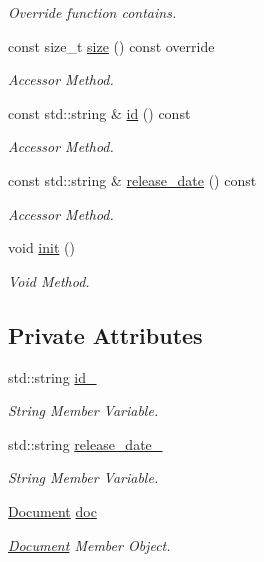 \begin{DoxyCompactItemize}
\begin{DoxyCompactList}\small\item\em Override function contains. \end{DoxyCompactList}\item 
const size\+\_\+t \hyperlink{class_movie_ad396ecf97c83fb48c09d2ea6138b430a}{size} () const override
\begin{DoxyCompactList}\small\item\em Accessor Method. \end{DoxyCompactList}\item 
\mbox{\label{class_movie_a8c874927c4c49945d810a39938f64115}} 
const std\+::string \& \hyperlink{class_movie_a8c874927c4c49945d810a39938f64115}{id} () const
\begin{DoxyCompactList}\small\item\em Accessor Method. \end{DoxyCompactList}\item 
\mbox{\label{class_movie_aac8f46b332b732fa78bf19bd11b6bf8f}} 
const std\+::string \& \hyperlink{class_movie_aac8f46b332b732fa78bf19bd11b6bf8f}{release\+\_\+date} () const
\begin{DoxyCompactList}\small\item\em Accessor Method. \end{DoxyCompactList}\item 
void \hyperlink{class_movie_a132f64e865e4fb8e03e9e422ef24579d}{init} ()
\begin{DoxyCompactList}\small\item\em Void Method. \end{DoxyCompactList}\end{DoxyCompactItemize}
\subsection*{Private Attributes}
\begin{DoxyCompactItemize}
\item 
std\+::string \hyperlink{class_movie_a7cee82dbea485a5cbe98d850fb1ae253}{id\+\_\+}
\begin{DoxyCompactList}\small\item\em String Member Variable. \end{DoxyCompactList}\item 
std\+::string \hyperlink{class_movie_a34bde460ddda08989206136b9b07aebf}{release\+\_\+date\+\_\+}
\begin{DoxyCompactList}\small\item\em String Member Variable. \end{DoxyCompactList}\item 
\hyperlink{class_document}{Document} \hyperlink{class_movie_aadb7c41518aa8d7d8301793368cef929}{doc}
\begin{DoxyCompactList}\small\item\em \hyperlink{class_document}{Document} Member Object. \end{DoxyCompactList}\end{DoxyCompactItemize}
